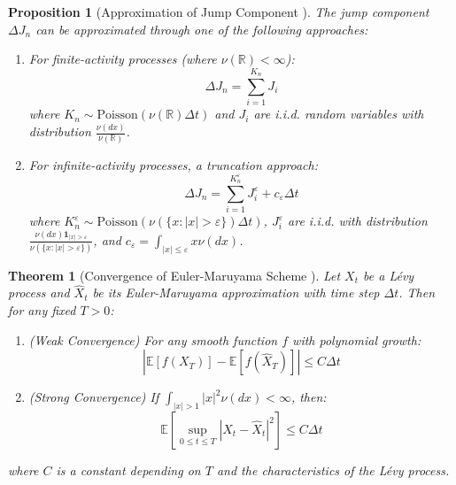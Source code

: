 \documentclass[a4paper,12pt]{report}
\newtheorem{theorem}{Theorem}
\newtheorem{proposition}{Proposition}
\begin{document}
    \begin{proposition}[Approximation of Jump Component \cite{platen2010numerical, applebaum2009levy}]
        The jump component $\Delta J_n$ can be approximated through one of the following approaches:
        \begin{enumerate}
            \item For finite-activity processes (where $\nu(\mathbb{R}) < \infty$):
                  \begin{equation}
                      \Delta J_n = \sum_{i=1}^{K_n} J_i
                  \end{equation}
                  where $K_n \sim \text{Poisson}(\nu(\mathbb{R})\Delta t)$ and $J_i$ are i.i.d. random variables with distribution $\frac{\nu(dx)}{\nu(\mathbb{R})}$.

            \item For infinite-activity processes, a truncation approach:
                  \begin{equation}
                      \Delta J_n = \sum_{i=1}^{K^{\varepsilon}_n} J^{\varepsilon}_i + c_{\varepsilon}\Delta t
                  \end{equation}
                  where $K^{\varepsilon}_n \sim \text{Poisson}(\nu(\{x: |x| > \varepsilon\})\Delta t)$, $J^{\varepsilon}_i$ are i.i.d. with distribution $\frac{\nu(dx)\mathbf{1}_{|x|>\varepsilon}}{\nu(\{x: |x| > \varepsilon\})}$, and $c_{\varepsilon} = \int_{|x|\leq\varepsilon} x\nu(dx)$.
        \end{enumerate}
    \end{proposition}
\fi
\begin{theorem}[Convergence of Euler-Maruyama Scheme \citep{higham2005numerical, platen2010numerical}]
    \label{thm:euler_maruyama_convergence}
    Let $X_t$ be a Lévy process and $\hat{X}_t$ be its Euler-Maruyama approximation with time step $\Delta t$. Then for any fixed $T > 0$:
    \begin{enumerate}
        \item (Weak Convergence) For any smooth function $f$ with polynomial growth:
              \begin{equation}
                  |\mathbb{E}[f(X_T)] - \mathbb{E}[f(\hat{X}_T)]| \leq C\Delta t
              \end{equation}

        \item (Strong Convergence) If $\int_{|x|>1} |x|^2 \nu(dx) < \infty$, then:
              \begin{equation}
                  \mathbb{E}[\sup_{0\leq t\leq T} |X_t - \hat{X}_t|^2] \leq C\Delta t
              \end{equation}
    \end{enumerate}
    where $C$ is a constant depending on $T$ and the characteristics of the Lévy process.

\end{theorem}
\end{document}
